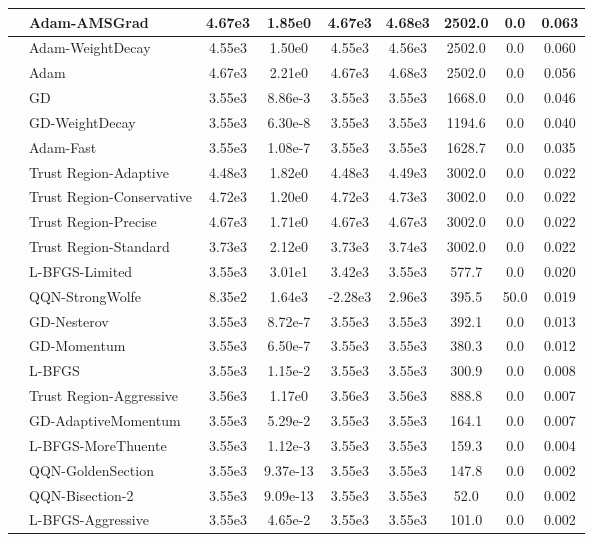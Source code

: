 \documentclass{article}
\begin{document}
\begin{longtable}{|l|l|c|c|c|c|c|c|c|}
\hline
 & Adam-AMSGrad & 4.67e3 & 1.85e0 & 4.67e3 & 4.68e3 & 2502.0 & 0.0 & 0.063 \\
\hline
 & Adam-WeightDecay & 4.55e3 & 1.50e0 & 4.55e3 & 4.56e3 & 2502.0 & 0.0 & 0.060 \\
\hline
 & Adam & 4.67e3 & 2.21e0 & 4.67e3 & 4.68e3 & 2502.0 & 0.0 & 0.056 \\
\hline
 & GD & 3.55e3 & 8.86e-3 & 3.55e3 & 3.55e3 & 1668.0 & 0.0 & 0.046 \\
\hline
 & GD-WeightDecay & 3.55e3 & 6.30e-8 & 3.55e3 & 3.55e3 & 1194.6 & 0.0 & 0.040 \\
\hline
 & Adam-Fast & 3.55e3 & 1.08e-7 & 3.55e3 & 3.55e3 & 1628.7 & 0.0 & 0.035 \\
\hline
 & Trust Region-Adaptive & 4.48e3 & 1.82e0 & 4.48e3 & 4.49e3 & 3002.0 & 0.0 & 0.022 \\
\hline
 & Trust Region-Conservative & 4.72e3 & 1.20e0 & 4.72e3 & 4.73e3 & 3002.0 & 0.0 & 0.022 \\
\hline
 & Trust Region-Precise & 4.67e3 & 1.71e0 & 4.67e3 & 4.67e3 & 3002.0 & 0.0 & 0.022 \\
\hline
 & Trust Region-Standard & 3.73e3 & 2.12e0 & 3.73e3 & 3.74e3 & 3002.0 & 0.0 & 0.022 \\
\hline
 & L-BFGS-Limited & 3.55e3 & 3.01e1 & 3.42e3 & 3.55e3 & 577.7 & 0.0 & 0.020 \\
\hline
 & QQN-StrongWolfe & 8.35e2 & 1.64e3 & -2.28e3 & 2.96e3 & 395.5 & 50.0 & 0.019 \\
\hline
 & GD-Nesterov & 3.55e3 & 8.72e-7 & 3.55e3 & 3.55e3 & 392.1 & 0.0 & 0.013 \\
\hline
 & GD-Momentum & 3.55e3 & 6.50e-7 & 3.55e3 & 3.55e3 & 380.3 & 0.0 & 0.012 \\
\hline
 & L-BFGS & 3.55e3 & 1.15e-2 & 3.55e3 & 3.55e3 & 300.9 & 0.0 & 0.008 \\
\hline
 & Trust Region-Aggressive & 3.56e3 & 1.17e0 & 3.56e3 & 3.56e3 & 888.8 & 0.0 & 0.007 \\
\hline
 & GD-AdaptiveMomentum & 3.55e3 & 5.29e-2 & 3.55e3 & 3.55e3 & 164.1 & 0.0 & 0.007 \\
\hline
 & L-BFGS-MoreThuente & 3.55e3 & 1.12e-3 & 3.55e3 & 3.55e3 & 159.3 & 0.0 & 0.004 \\
\hline
 & QQN-GoldenSection & 3.55e3 & 9.37e-13 & 3.55e3 & 3.55e3 & 147.8 & 0.0 & 0.002 \\
\hline
 & QQN-Bisection-2 & 3.55e3 & 9.09e-13 & 3.55e3 & 3.55e3 & 52.0 & 0.0 & 0.002 \\
\hline
 & L-BFGS-Aggressive & 3.55e3 & 4.65e-2 & 3.55e3 & 3.55e3 & 101.0 & 0.0 & 0.002 \\

\end{longtable}
\end{document}
